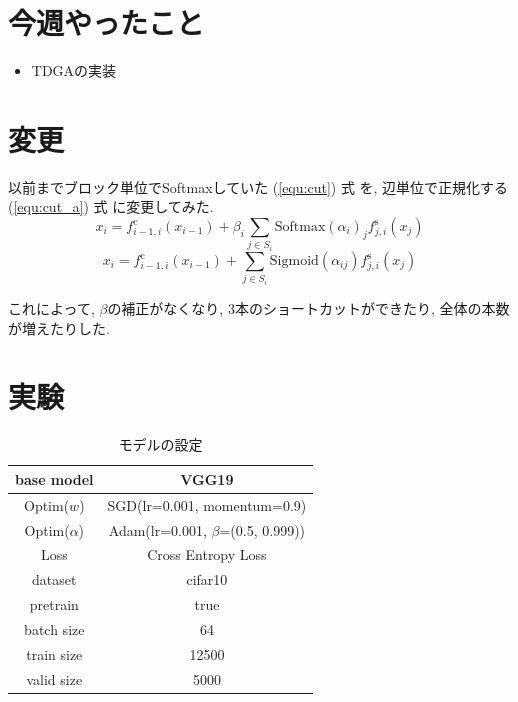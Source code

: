 \documentclass[twocolumn]{jarticle}     %
\begin{document}


\section{今週やったこと}
\begin{itemize}
  \item TDGAの実装
\end{itemize}

\section{変更}

以前までブロック単位でSoftmaxしていた (\ref{equ:cut}) 式 を, 辺単位で正規化する (\ref{equ:cut_a}) 式 に変更してみた.
\begin{equation}
  \label{equ:cut}
  x_i = f^{\mathrm{c}}_{i-1, i}(x_{i-1}) + \beta_i \sum_{j \in S_i} \mathrm{Softmax} ( \alpha_{i})_j f^{\mathrm{s}}_{j, i} (x_j)
\end{equation}
\begin{equation}
  \label{equ:cut_a}
  x_i = f^{\mathrm{c}}_{i-1, i}(x_{i-1}) + \sum_{j \in S_i} \mathrm{Sigmoid} ( \alpha_{ij}) f^{\mathrm{s}}_{j, i} (x_j)
\end{equation}

これによって, $\beta$の補正がなくなり, 3本のショートカットができたり, 全体の本数が増えたりした.

\section{実験}

\begin{table}[tb]
  \begin{center}
    \caption{モデルの設定}
    \begin{tabular}{|c|c|} \hline
      base model & VGG19 \\ \hline
      Optim($w$) & SGD(lr=0.001, momentum=0.9) \\ \hline
      Optim($\alpha$) & Adam(lr=0.001, $\beta$=(0.5, 0.999)) \\ \hline
      Loss & Cross Entropy Loss \\ \hline
      dataset & cifar10 \\ \hline
      pretrain & true \\ \hline
      batch size & 64 \\ \hline
      train size & 12500 \\ \hline
      valid size & 5000 \\ \hline
    \end{tabular}
    \label{tab:setting}
  \end{center}
\end{table}
\end{document}
